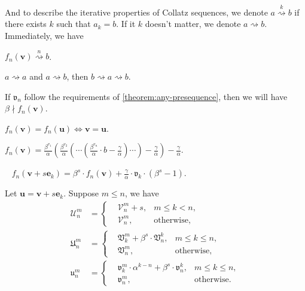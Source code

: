 And to describe the iterative properties of Collatz sequences, we denote $a \overset{k}{\rightsquigarrow} b$ if there exists $k$ such that $a_k = b$.
If it $k$ doesn't matter, we denote $a \rightsquigarrow b$.
Immediately, we have
\begin{proposition}
    $f_{n}(\bm{v}) \overset{n}{\rightsquigarrow} b$.
\end{proposition}
\begin{proposition}
    $a\rightsquigarrow a$ and $a \rightsquigarrow b$, then $b \rightsquigarrow a \rightsquigarrow b$.
\end{proposition}
\begin{proposition}
    If $\mathfrak{v}_{n}$ follow the requirements of \cref{theorem:any-presequence}, then we will have $\beta \nmid f_{n}(\bm{v})$.
\end{proposition}
\begin{proposition}
    $f_{n}(\bm{v}) = f_{n}(\bm{u}) \Longleftrightarrow \bm{v} = \bm{u}$.
\end{proposition}
\begin{proposition}
    $f_{n}(\bm{v}) = \frac{\beta^{v_{1}}}{\alpha}\left(\frac{\beta^{v_{2}}}{\alpha}\left(\cdots \left(\frac{\beta^{v_{n}}}{\alpha}\cdot b - \frac{\gamma}{\alpha}\right)\cdots\right)- \frac{\gamma}{\alpha}\right) - \frac{\gamma}{\alpha}$.
\end{proposition}
\begin{proposition}~\label{prop:single-vary-rule}
$f_{n}(\bm{v}+s\bm{e}_{k}) = \beta^{s}\cdot f_{n}(\bm{v}) + \frac{\gamma}{\alpha}\cdot\mathfrak{v}_{k}\cdot(\beta^{s} - 1)$.
\end{proposition}
\begin{proposition}
    Let $\bm{u} = \bm{v}+s\bm{e}_{k}$. Suppose $m\le n$, we have
    \begin{align*}
        \mathcal{U}_{n}^{m} &= \left\{\begin{aligned}
        &\mathcal{V}_{n}^{m} + s, & m\le k < n, \\
        &\mathcal{V}_{n}^{m}, & \text{otherwise},
    \end{aligned}\right. \\
    \mathfrak{U}_{n}^{m} &= \left\{\begin{aligned}
        &\mathfrak{V}_{k}^{m} + \beta^{s}\cdot \mathfrak{V}_{n}^{k}, & m\le k \le n, \\
        &\mathfrak{V}_{n}^{m}, & \text{otherwise},
    \end{aligned}\right. \\
    \mathfrak{u}_{n}^{m} &= \left\{\begin{aligned}
        &\mathfrak{v}_{k}^{m}\cdot\alpha^{k-n} + \beta^{s}\cdot \mathfrak{v}_{n}^{k}, & m\le k \le n, \\
        &\mathfrak{v}_{n}^{m}, & \text{otherwise}.
    \end{aligned}\right.
    \end{align*}
\end{proposition}
